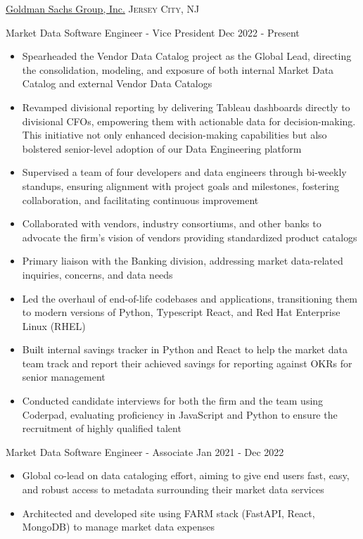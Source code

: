 \documentclass[10pt,letterpaper]{article}
\begin{document}
\headedsection
  {\href{http://www.goldmansachs.com/}{Goldman Sachs Group, Inc.}}
  {\textsc{Jersey City, NJ}} {
  \headedsubsection
    {Market Data Software Engineer - Vice President}
    {Dec 2022 - Present}
    {\begin{itemize}
    \item Spearheaded the Vendor Data Catalog project as the Global Lead, directing the consolidation, modeling, and exposure of both internal Market Data Catalog and external Vendor Data Catalogs
    \item Revamped divisional reporting by delivering Tableau dashboards directly to divisional CFOs, empowering them with actionable data for decision-making. This initiative not only enhanced decision-making capabilities but also bolstered senior-level adoption of our Data Engineering platform
    \item Supervised a team of four developers and data engineers through bi-weekly standups, ensuring alignment with project goals and milestones, fostering collaboration, and facilitating continuous improvement
    \item Collaborated with vendors, industry consortiums, and other banks to advocate the firm's vision of vendors providing standardized product catalogs
    \item Primary liaison with the Banking division, addressing market data-related inquiries, concerns, and data needs
    \item Led the overhaul of end-of-life codebases and applications, transitioning them to modern versions of Python, Typescript React, and Red Hat Enterprise Linux (RHEL)
    \item Built internal savings tracker in Python and React to help the market data team track and report their achieved savings for reporting against OKRs for senior management
    \item Conducted candidate interviews for both the firm and the team using Coderpad, evaluating proficiency in JavaScript and Python to ensure the recruitment of highly qualified talent
    \end{itemize}}
  \headedsubsection
    {Market Data Software Engineer - Associate}
    {Jan 2021 - Dec 2022}
    {\begin{itemize}
    \item Global co-lead on data cataloging effort, aiming to give end users fast, easy, and robust access to metadata surrounding their market data services
    \item Architected and developed site using FARM stack (FastAPI, React, MongoDB) to manage market data expenses

\end{itemize}}}
\end{document}
